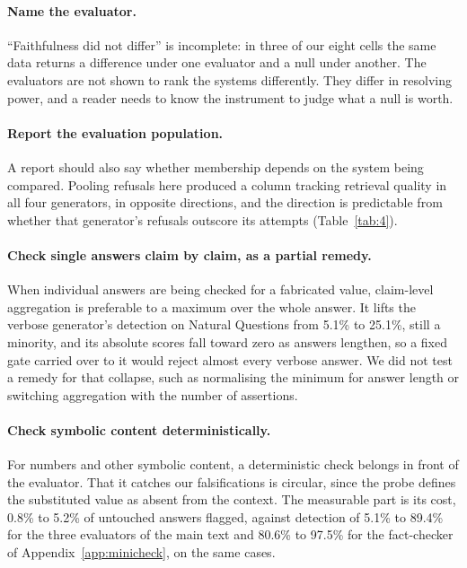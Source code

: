 \documentclass[11pt]{article}
\begin{document}
\paragraph{Name the evaluator.} ``Faithfulness did not differ'' is incomplete: in three of our eight cells the same data returns a difference under one evaluator and a null under another. The evaluators are not shown to rank the systems differently. They differ in resolving power, and a reader needs to know the instrument to judge what a null is worth.

\paragraph{Report the evaluation population.} A report should also say whether membership depends on the system being compared. Pooling refusals here produced a column tracking retrieval quality in all four generators, in opposite directions, and the direction is predictable from whether that generator's refusals outscore its attempts (Table~\ref{tab:4}).

\paragraph{Check single answers claim by claim, as a partial remedy.} When individual answers are being checked for a fabricated value, claim-level aggregation is preferable to a maximum over the whole answer. It lifts the verbose generator's detection on Natural Questions from 5.1\% to 25.1\%, still a minority, and its absolute scores fall toward zero as answers lengthen, so a fixed gate carried over to it would reject almost every verbose answer. We did not test a remedy for that collapse, such as normalising the minimum for answer length or switching aggregation with the number of assertions.

\paragraph{Check symbolic content deterministically.} For numbers and other symbolic content, a deterministic check belongs in front of the evaluator. That it catches our falsifications is circular, since the probe defines the substituted value as absent from the context. The measurable part is its cost, 0.8\% to 5.2\% of untouched answers flagged, against detection of 5.1\% to 89.4\% for the three evaluators of the main text and 80.6\% to 97.5\% for the fact-checker of Appendix~\ref{app:minicheck}, on the same cases.
\end{document}
